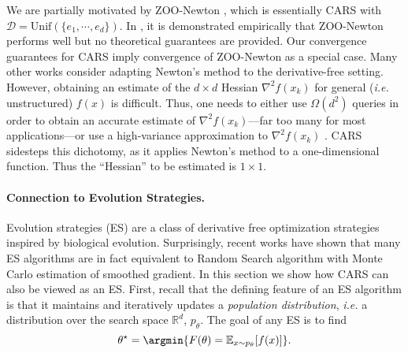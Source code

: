 We are partially motivated by ZOO-Newton \cite{chen2017zoo}, which is essentially CARS with $\mathcal{D} = \mathrm{Unif}(\{e_1,\cdots, e_d\})$. In \cite{chen2017zoo}, it is demonstrated empirically that ZOO-Newton performs well but no theoretical guarantees are provided. Our convergence guarantees for CARS imply convergence of ZOO-Newton as a special case. Many other works consider adapting Newton's method to the derivative-free setting. However, obtaining an estimate of the $d\times d$ Hessian $\nabla^{2}f(x_k)$ for general ({\em i.e.} unstructured) $f(x)$ is difficult. Thus, one needs to either use $\Omega(d^2)$ queries \cite{fabian1971stochastic} in order to obtain an accurate estimate of $\nabla^2f(x_k)$---far too many for most applications---or use a high-variance approximation to $\nabla^{2}f(x_k)$ \cite{spall2000adaptive,ye2018hessian,glasmachers2020hessian,zhu2019efficient,zhu2020hessian}. CARS sidesteps this dichotomy, as it applies Newton's method to a one-dimensional function. Thus the ``Hessian'' to be estimated is $1 \times 1$.

\paragraph{Connection to Evolution Strategies.}\label{section: connection to ES}
Evolution strategies (ES) are a class of derivative free optimization strategies inspired by biological evolution. Surprisingly, recent works \cite{salimans2017evolution} have shown that many ES algorithms are in fact equivalent to Random Search algorithm \cite{nesterov2017random} with Monte Carlo estimation of smoothed gradient. In this section we show how CARS can also be viewed as an ES. First, recall that the defining feature of an ES algorithm is that it maintains and iteratively updates a {\em population distribution}, {\em i.e.} a distribution over the search space $\mathbb{R}^{d}$, $p_{\theta}$. The goal of any ES is to find
\begin{equation*}
    \theta^{\star} = \argmin \{ F(\theta) = \mathbb{E}_{x \sim p_{\theta}}[f(x)]\}.
\end{equation*}

